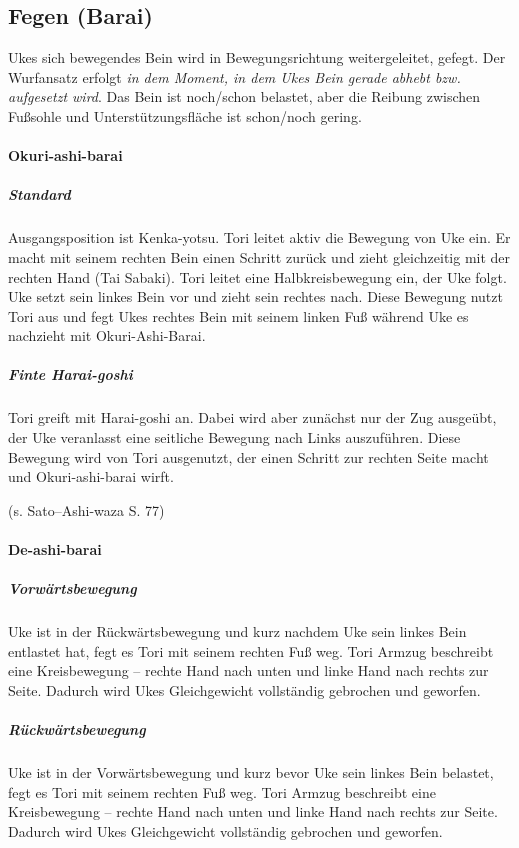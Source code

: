 \documentclass[justified, a4paper, notitlepage, captions=tableheading, nobib]{tufte-handout}
\begin{document}
\subsection{Fegen (Barai)}
\label{sec:orge058659}
Ukes sich bewegendes Bein wird in Bewegungsrichtung weitergeleitet, gefegt. 
Der Wurfansatz erfolgt \emph{in dem Moment, in dem Ukes Bein gerade abhebt bzw. aufgesetzt wird}. 
Das Bein ist noch/schon belastet, aber die Reibung zwischen Fußsohle und Unterstützungsfläche ist schon/noch gering.

\paragraph{Okuri-ashi-barai }
\label{sec:org81f1009}

\subparagraph{Standard}
\label{sec:org303cf08}
Ausgangsposition ist Kenka-yotsu. Tori leitet aktiv die Bewegung von Uke ein. Er macht mit seinem rechten Bein einen Schritt zurück und zieht gleichzeitig mit der rechten Hand (Tai Sabaki). Tori leitet eine Halbkreisbewegung ein, der Uke folgt. Uke setzt sein linkes Bein vor und zieht sein rechtes nach. Diese Bewegung nutzt Tori aus und fegt Ukes rechtes Bein mit seinem linken Fuß während Uke es nachzieht mit Okuri-Ashi-Barai.

\subparagraph{Finte Harai-goshi}
\label{sec:org4a1cb2b}
Tori greift mit Harai-goshi an. Dabei wird aber zunächst nur der Zug ausgeübt, der Uke veranlasst eine seitliche Bewegung nach Links auszuführen. 
Diese Bewegung wird von Tori ausgenutzt, der einen Schritt zur rechten Seite macht und Okuri-ashi-barai wirft.

(s. Sato--Ashi-waza S. 77)

\paragraph{De-ashi-barai }
\label{sec:orgae00eb1}

\subparagraph{Vorwärtsbewegung}
\label{sec:org8cd550d}
Uke ist in der Rückwärtsbewegung und kurz nachdem Uke sein linkes Bein entlastet hat, fegt es Tori mit seinem rechten Fuß weg. Tori Armzug beschreibt eine Kreisbewegung – rechte Hand nach unten und linke Hand nach rechts zur Seite. Dadurch wird Ukes Gleichgewicht vollständig gebrochen und geworfen.

\subparagraph{Rückwärtsbewegung}
\label{sec:orgb491c57}
Uke ist in der Vorwärtsbewegung und kurz bevor Uke sein linkes Bein belastet, fegt es Tori mit seinem rechten Fuß weg. Tori Armzug beschreibt eine Kreisbewegung – rechte Hand nach unten und linke Hand nach rechts zur Seite. Dadurch wird Ukes Gleichgewicht vollständig gebrochen und geworfen.
\end{document}
